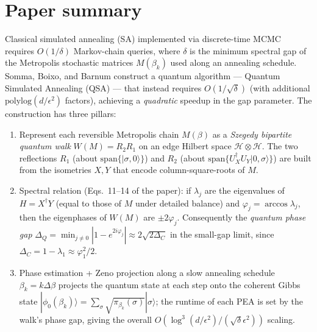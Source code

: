 \documentclass[11pt]{article}
\begin{document}
\section{Paper summary}
Classical simulated annealing (SA) implemented via discrete-time MCMC
requires $O(1/\delta)$ Markov-chain queries, where $\delta$ is the minimum
spectral gap of the Metropolis stochastic matrices $M(\beta_k)$ used along
an annealing schedule. Somma, Boixo, and Barnum construct a quantum
algorithm --- Quantum Simulated Annealing (QSA) --- that instead requires
$O(1/\sqrt{\delta})$ (with additional $\mathrm{polylog}(d/\epsilon^2)$
factors), achieving a \emph{quadratic} speedup in the gap parameter. The
construction has three pillars:
\begin{enumerate}
  \item Represent each reversible Metropolis chain $M(\beta)$ as a
    \emph{Szegedy bipartite quantum walk} $W(M) = R_2 R_1$ on an edge
    Hilbert space $\mathcal{H} \otimes \mathcal{H}$. The two reflections
    $R_1$ (about $\mathrm{span}\{|\sigma, 0\rangle\}$) and $R_2$ (about
    $\mathrm{span}\{U_X^\dagger U_Y |0, \sigma\rangle\}$) are built from
    the isometries $X, Y$ that encode column-square-roots of $M$.
  \item Spectral relation (Eqs.\ 11--14 of the paper): if $\lambda_j$ are
    the eigenvalues of $H = X^\dagger Y$ (equal to those of $M$ under
    detailed balance) and $\varphi_j = \arccos\lambda_j$, then the
    eigenphases of $W(M)$ are $\pm 2\varphi_j$. Consequently the
    \emph{quantum phase gap} $\Delta_Q = \min_{j \ne 0} |1 - e^{2 i \varphi_j}|
    \approx 2\sqrt{2\Delta_C}$ in the small-gap limit, since
    $\Delta_C = 1 - \lambda_1 \approx \varphi_1^2 / 2$.
  \item Phase estimation + Zeno projection along a slow annealing schedule
    $\beta_k = k\Delta\beta$ projects the quantum state at each step onto
    the coherent Gibbs state $|\phi_0(\beta_k)\rangle = \sum_\sigma
    \sqrt{\pi_{\beta_k}(\sigma)} |\sigma\rangle$; the runtime of each PEA
    is set by the walk's phase gap, giving the overall
    $O(\log^3(d/\epsilon^2)/(\sqrt{\delta}\epsilon^2))$ scaling.
\end{enumerate}
\end{document}
